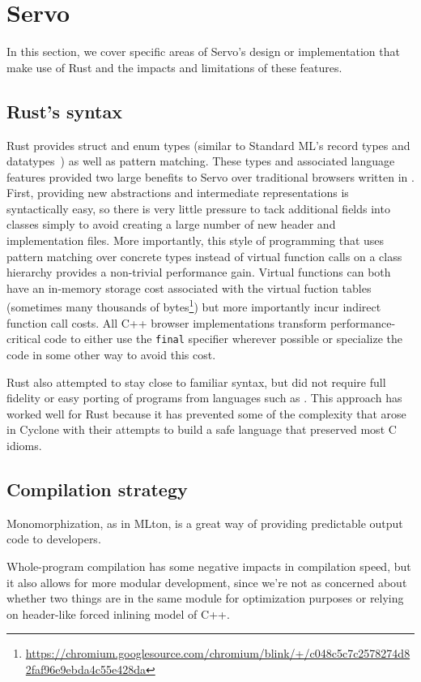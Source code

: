 \section{Servo}
\label{sec:servo}
In this section, we cover specific areas of Servo's design or implementation that make use of Rust
and the impacts and limitations of these features.

\subsection{Rust's syntax}
Rust provides struct and enum types (similar to Standard ML's record types and datatypes~\cite{sml97-definition}) as
well as pattern matching.
These types and associated language features provided two large benefits to Servo over traditional browsers
written in \Cplusplus{}.
First, providing new abstractions and intermediate representations is syntactically easy, so there is very little
pressure to tack additional fields into classes simply to avoid creating a large number of new header and implementation
files.
More importantly, this style of programming that uses pattern matching over concrete types instead of
virtual function calls on a class hierarchy provides a non-trivial performance gain.
Virtual functions can both have an in-memory storage cost associated with the virtual fuction tables (sometimes many thousands of bytes\footnote{\url{https://chromium.googlesource.com/chromium/blink/+/c048c5c7c2578274d82faf96e9ebda4c55e428da}}) but more importantly
incur indirect function call costs.
All C++ browser implementations transform performance-critical code to either use the \lstinline[language=C]{final}
specifier wherever possible or specialize the code in some other way to avoid this cost.

Rust also attempted to stay close to familiar syntax, but did not require full fidelity or easy porting of
programs from languages such as \Cplusplus{}.
This approach has worked well for Rust because it has prevented some of the complexity that arose in Cyclone
with their attempts to build a safe language that preserved most C idioms.

\subsection{Compilation strategy}
Monomorphization, as in MLton, is a great way of providing predictable output code to developers.

Whole-program compilation has some negative impacts in compilation speed, but it also allows for more modular development, since we're not as concerned about whether two things are in the same module for optimization purposes or relying on header-like forced inlining model of C++.

